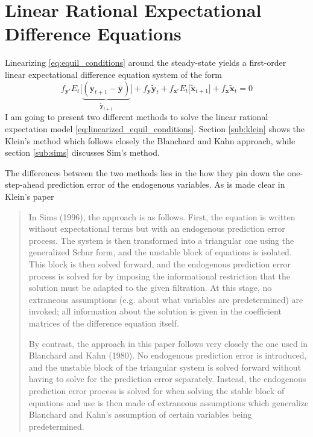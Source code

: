 \documentclass[a4paper,10pt]{article}  %
\begin{document}


\newpage
\section{Linear Rational Expectational Difference Equations} %
\label{sec:linear_rational_expectational_difference_equations}

Linearizing \eqref{eq:equil_conditions} around the steady-state yields a first-order linear expectational difference
equation system of the form
\begin{equation}
   \label{eq:linearized_equil_conditions}
   f_{ \mathbf{y}' } E_t \Big[ \underbrace{ ( \mathbf{y}_{t+1} -  \bar{\mathbf{y}}) }_{ \tilde{\mathbf{y}}_{t+1} } \Big] 
   + f_{ \mathbf{y} }   \tilde{\mathbf{y}}_t  
   + f_{ \mathbf{x}' }  E_t \Big[  \tilde{\mathbf{x}}_{t+1} \Big]
   + f_{ \mathbf{x} }   \tilde{\mathbf{x}}_{t}
   = 0
\end{equation}
I am going to present two different methods to solve the linear rational expectation model \eqref{eq:linearized_equil_conditions}.
Section \ref{sub:klein} shows the Klein's method which follows closely the Blanchard and Kahn approach, while section \ref{sub:sims}
discusses Sim's method.

The differences between the two methods lies in the how they pin down the one-step-ahead prediction error of the
endogenous variables. As is made clear in Klein's paper
\begin{quote}\small
   In Sims (1996), the approach is as follows. First, the equation is written without expectational terms but with an endogenous
   prediction error process. The system is then transformed into a triangular one using the generalized Schur form, and the unstable
   block of equations is isolated. This block is then solved forward, and the endogenous prediction error process is solved for by
   imposing the informational restriction that the solution must be adapted to the given filtration. At this stage, no extraneous
   assumptions (e.g. about what variables are predetermined) are invoked; all information about the solution is given in the
   coefficient matrices of the difference equation itself.

   By contrast, the approach in this paper follows very closely the one used in Blanchard and Kahn (1980). No endogenous prediction
   error is introduced, and the unstable block of the triangular system is solved forward without having to solve for the prediction
   error separately. Instead, the endogenous prediction error process is solved for when solving the stable block of equations and use
   is then made of extraneous assumptions which generalize Blanchard and Kahn's assumption of certain variables being predetermined.
\end{quote}\normalsize
\end{document}
